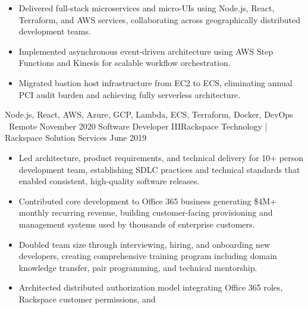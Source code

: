 \begin{experiences}
{\begin{itemize}
                        \ifcv
                        \item Delivered full-stack microservices and micro-UIs using
                              Node.js, React, Terraform, and AWS services,
                              collaborating across geographically distributed
                              development teams.
                        \item Implemented asynchronous event-driven architecture using
                              AWS Step Functions and Kinesis for scalable workflow
                              orchestration.
                        \item Migrated bastion host infrastructure from EC2 to ECS,
                              eliminating annual PCI audit burden and achieving fully
                              serverless architecture.
                        \fi
                      \end{itemize}
                    }
                    {Node.js, React, AWS, Azure, GCP, Lambda, ECS, Terraform, Docker, DevOps}
                    {\faHome\ Remote}
  \emptySeparator
  \experience
    {November 2020} {Software Developer III}{Rackspace Technology | Rackspace Solution Services}
    {June 2019}     {
                      \begin{itemize}
                        \item Led architecture, product requirements, and technical
                              delivery for 10+ person development team, establishing
                              SDLC practices and technical standards that enabled
                              consistent, high-quality software releases.
                        \item Contributed core development to Office 365 business
                              generating \$4M+ monthly recurring revenue, building
                              customer-facing provisioning and management systems used
                              by thousands of enterprise customers.
                        \item Doubled team size through interviewing, hiring, and
                              onboarding new developers, creating comprehensive training
                              program including domain knowledge transfer, pair
                              programming, and technical mentorship.
                        \item Architected distributed authorization model integrating
                              Office 365 roles, Rackspace customer permissions, and

\end{itemize}}
\end{experiences}
